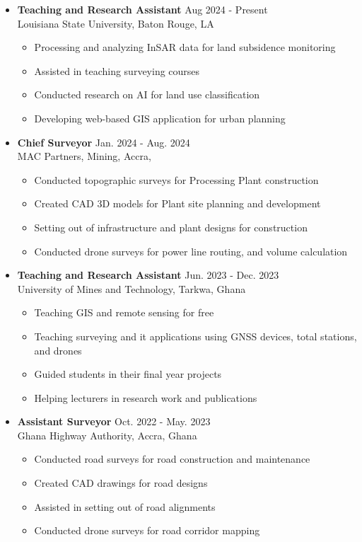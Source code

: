 \documentclass[a4paper,10pt]{article}
\begin{document}
\begin{itemize}[leftmargin=*, noitemsep]
    \item \textbf{Teaching and Research Assistant} \hfill Aug 2024 {-} Present \\
    Louisiana State University, Baton Rouge, LA
    \begin{itemize}[noitemsep]
        \item Processing and analyzing InSAR data for land subsidence monitoring
        \item Assisted in teaching surveying courses
        \item Conducted research on AI for land use classification
        \item Developing web-based GIS application for urban planning
    \end{itemize}

    \item \textbf{Chief Surveyor} \hfill Jan. 2024 {-} Aug. 2024 \\
    MAC Partners, Mining, Accra, 
    \begin{itemize}[noitemsep]
        \item Conducted topographic surveys for Processing Plant construction
        \item Created CAD 3D models for Plant site planning and development
        \item Setting out of infrastructure and plant designs for construction
        \item Conducted drone surveys for power line routing, and volume calculation
    \end{itemize}

    \item \textbf{Teaching and Research Assistant} \hfill Jun. 2023 {-} Dec. 2023 \\
    University of Mines and Technology, Tarkwa, Ghana
    \begin{itemize}[noitemsep]
        \item Teaching GIS and remote sensing for free
        \item Teaching surveying and it applications using GNSS devices, total stations, and drones
        \item Guided students in their final year projects
        \item Helping lecturers in research work and publications
    \end{itemize}

    \item \textbf{Assistant Surveyor} \hfill Oct. 2022 {-} May. 2023 \\
    Ghana Highway Authority, Accra, Ghana
    \begin{itemize}[noitemsep]
        \item Conducted road surveys for road construction and maintenance
        \item Created CAD drawings for road designs
        \item Assisted in setting out of road alignments
        \item Conducted drone surveys for road corridor mapping
    \end{itemize}



\end{itemize}
\end{document}
